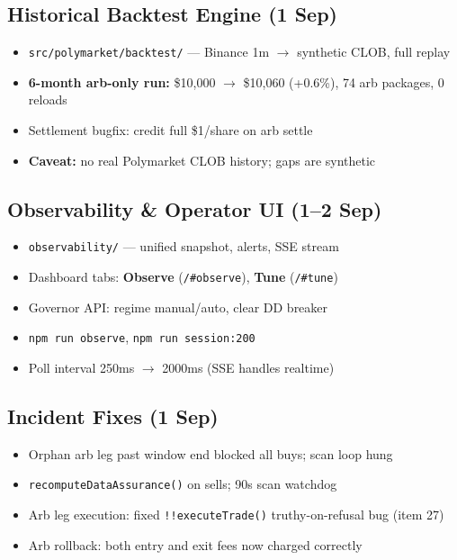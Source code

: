 \documentclass[11pt,a4paper]{article}
\begin{document}
\subsection{Historical Backtest Engine (1 Sep)}
\begin{itemize}[noitemsep]
  \item \texttt{src/polymarket/backtest/} --- Binance 1m $\rightarrow$ synthetic CLOB, full replay
  \item \textbf{6-month arb-only run:} \$10{,}000 $\rightarrow$ \$10{,}060 (+0.6\%), 74 arb packages, 0 reloads
  \item Settlement bugfix: credit full \$1/share on arb settle
  \item \textbf{Caveat:} no real Polymarket CLOB history; gaps are synthetic
\end{itemize}

\subsection{Observability \& Operator UI (1--2 Sep)}
\begin{itemize}[noitemsep]
  \item \texttt{observability/} --- unified snapshot, alerts, SSE stream
  \item Dashboard tabs: \textbf{Observe} (\texttt{/\#observe}), \textbf{Tune} (\texttt{/\#tune})
  \item Governor API: regime manual/auto, clear DD breaker
  \item \texttt{npm run observe}, \texttt{npm run session:200}
  \item Poll interval 250ms $\rightarrow$ 2000ms (SSE handles realtime)
\end{itemize}

\subsection{Incident Fixes (1 Sep)}
\begin{itemize}[noitemsep]
  \item Orphan arb leg past window end blocked all buys; scan loop hung
  \item \texttt{recomputeDataAssurance()} on sells; 90s scan watchdog
  \item Arb leg execution: fixed \texttt{!!executeTrade()} truthy-on-refusal bug (item 27)
  \item Arb rollback: both entry and exit fees now charged correctly
\end{itemize}
\end{document}
